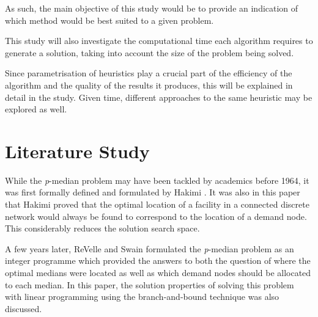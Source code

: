 \documentclass[11pt]{article}
\begin{document}
	As such, the main objective of this study would be to provide an indication of which method would be best suited to a given problem.
	
	This study will also investigate the computational time each algorithm requires to generate a solution, taking into account the size of the problem being solved.
	
	Since parametrisation of heuristics play a crucial part of the efficiency of the algorithm and the quality of the results it produces, this will be explained in detail in the study.  Given time, different approaches to the same heuristic may be explored as well.	
	
	
	\section{Literature Study} \label{lit.study}
	While the \emph{p}-median problem may have been tackled by academics before 1964, it was first formally defined and formulated by Hakimi \cite{HAKI64}.  It was also in this paper that Hakimi proved that the optimal location of a facility in a connected discrete network would always be found to correspond to the location of a demand node.  This considerably reduces the solution search space.
	
	A few years later, ReVelle and Swain \cite{REVE70} formulated the \emph{p}-median problem as an integer programme  which provided the answers to both the question of where the optimal medians were located as well as which demand nodes should be allocated to each median.  In this paper, the solution properties of solving this problem with linear programming  using the branch-and-bound technique  was also discussed.
	
\end{document}
